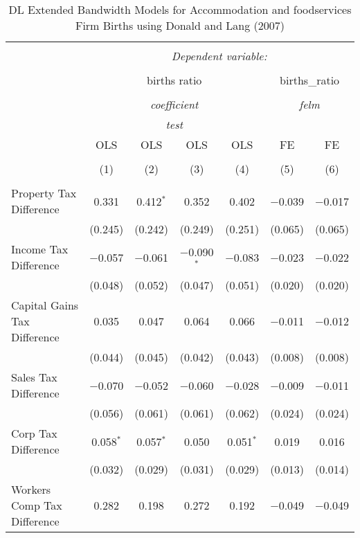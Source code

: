 
\begin{table}[!htbp] \centering 
  \caption{DL Extended Bandwidth Models for  Accommodation and foodservices Firm Births using Donald and Lang (2007)} 
  \label{} 
\begin{tabular}{@{\extracolsep{5pt}}lcccccc} 
\\[-1.8ex]\hline 
\hline \\[-1.8ex] 
 & \multicolumn{6}{c}{\textit{Dependent variable:}} \\ 
\cline{2-7} 
\\[-1.8ex] & \multicolumn{4}{c}{births ratio} & \multicolumn{2}{c}{births\_ratio} \\ 
\\[-1.8ex] & \multicolumn{4}{c}{\textit{coefficient}} & \multicolumn{2}{c}{\textit{felm}} \\ 
 & \multicolumn{4}{c}{\textit{test}} & \multicolumn{2}{c}{\textit{}} \\ 
 & OLS & OLS & OLS & OLS & FE & FE \\ 
\\[-1.8ex] & (1) & (2) & (3) & (4) & (5) & (6)\\ 
\hline \\[-1.8ex] 
 Property Tax Difference & 0.331 & 0.412$^{*}$ & 0.352 & 0.402 & $-$0.039 & $-$0.017 \\ 
  & (0.245) & (0.242) & (0.249) & (0.251) & (0.065) & (0.065) \\ 
  Income Tax Difference & $-$0.057 & $-$0.061 & $-$0.090$^{*}$ & $-$0.083 & $-$0.023 & $-$0.022 \\ 
  & (0.048) & (0.052) & (0.047) & (0.051) & (0.020) & (0.020) \\ 
  Capital Gains Tax Difference & 0.035 & 0.047 & 0.064 & 0.066 & $-$0.011 & $-$0.012 \\ 
  & (0.044) & (0.045) & (0.042) & (0.043) & (0.008) & (0.008) \\ 
  Sales Tax Difference & $-$0.070 & $-$0.052 & $-$0.060 & $-$0.028 & $-$0.009 & $-$0.011 \\ 
  & (0.056) & (0.061) & (0.061) & (0.062) & (0.024) & (0.024) \\ 
  Corp Tax Difference & 0.058$^{*}$ & 0.057$^{*}$ & 0.050 & 0.051$^{*}$ & 0.019 & 0.016 \\ 
  & (0.032) & (0.029) & (0.031) & (0.029) & (0.013) & (0.014) \\ 
  Workers Comp Tax Difference & 0.282 & 0.198 & 0.272 & 0.192 & $-$0.049 & $-$0.049 \\ 

\end{tabular}
\end{table}

